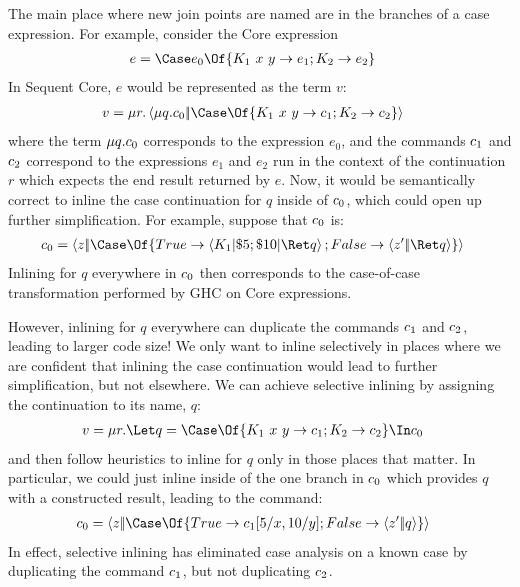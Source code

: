 \documentclass{article}
\begin{document}
The main place where new join points are named are in the branches of a case
expression.  For example, consider the Core expression
\begin{align*}
  e &= \Case e_0 \Of \{ K_1 ~ x ~ y \to e_1; K_2 \to e_2 \}
\end{align*}
In Sequent Core, $e$ would be represented as the term $v$:
\begin{align*}
  v
  &=
  \comp{r}
    \cut
    {\comp{q}\cmd_0}
    {\Case\Of \{ K_1 ~ x ~ y \to \cmd_1; K_2 \to \cmd_2 \}}
\end{align*}
where the term $\mu{q}.c_0$ corresponds to the expression $e_0$, and the
commands $c_1$ and $c_2$ correspond to the expressions $e_1$ and $e_2$ run
in the context of the continuation $r$ which expects the end result returned by
$e$.  Now, it would be semantically correct to inline the case continuation for
$q$ inside of $c_0$, which could open up further simplification.  For
example, suppose that $c_0$ is:
\begin{align*}
  \cmd_0
  &=
  \cut
  {z}
  {\Case\Of \{
    True \to \braket{K_1 | \appto{5} \then \appto{10} | \ret q};
    False \to \cut{z'}{\ret q}
  \}}
\end{align*}
Inlining for $q$ everywhere in $c_0$ then corresponds to the case-of-case
transformation performed by GHC on Core expressions.

However, inlining for $q$ everywhere can duplicate the commands $c_1$ and
$c_2$, leading to larger code size!  We only want to inline selectively in
places where we are confident that inlining the case continuation would lead to
further simplification, but not elsewhere.  We can achieve selective inlining by
assigning the continuation to its name, $q$:
\begin{align*}
  v
  &=
  \comp{r}
  \Let q = \Case\Of \{ K_1 ~ x ~ y \to \cmd_1; K_2 \to \cmd_2 \}
  \In \cmd_0
\end{align*}
and then follow heuristics to inline for $q$ only in those places that matter.
In particular, we could just inline inside of the one branch in $c_0$ which
provides $q$ with a constructed result, leading to the command:
\begin{align*}
  \cmd_0
  &=
  \cut{z}{\Case\Of \{ True \to \cmd_1[5/x,10/y]; False \to \cut{z'}{q} \}}
\end{align*}
In effect, selective inlining has eliminated case analysis on a known case by
duplicating the command $c_1$, but not duplicating $c_2$.
\end{document}
